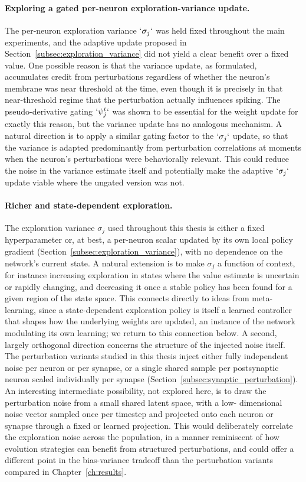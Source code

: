 \paragraph{Exploring a gated per-neuron exploration-variance update.} The
per-neuron exploration variance $`\sigma_j`$ was held fixed throughout the
main experiments, and the adaptive update proposed in
Section~\ref{subsec:exploration_variance} did not yield a clear benefit over
a fixed value. One possible reason is that the variance update, as
formulated, accumulates credit from perturbations regardless of whether the
neuron's membrane was near threshold at the time, even though it is
precisely in that near-threshold regime that the perturbation actually
influences spiking. The pseudo-derivative gating $`\psi_j^t`$ was shown to
be essential for the weight update for exactly this reason, but the
variance update has no analogous mechanism. A natural direction is to
apply a similar gating factor to the $`\sigma_j`$ update, so that the
variance is adapted predominantly from perturbation correlations at
moments when the neuron's perturbations were behaviorally relevant. This
could reduce the noise in the variance estimate itself and potentially make
the adaptive $`\sigma_j`$ update viable where the ungated version was not.

\paragraph{Richer and state-dependent exploration.} The exploration variance
$\sigma_j$ used throughout this thesis is either a fixed hyperparameter
or, at best, a per-neuron scalar updated by its own local policy gradient
(Section~\ref{subsec:exploration_variance}), with no dependence on the
network's current state. A natural extension is to make $\sigma_j$ a
function of context, for instance increasing exploration in states where
the value estimate is uncertain or rapidly changing, and decreasing it
once a stable policy has been found for a given region of the state
space. This connects directly to ideas from meta-learning, since a
state-dependent exploration policy is itself a learned controller that
shapes how the underlying weights are updated, an instance of the network
modulating its own learning; we return to
this connection below. A second, largely orthogonal direction concerns
the structure of the injected noise itself. The perturbation variants
studied in this thesis inject either fully independent noise per neuron
or per synapse, or a single shared sample per postsynaptic neuron scaled
individually per synapse (Section~\ref{subsec:synaptic_perturbation}).
An interesting intermediate possibility, not explored here, is to draw
the perturbation noise from a small shared latent space, with a low-
dimensional noise vector sampled once per timestep and projected onto
each neuron or synapse through a fixed or learned projection. This would
deliberately correlate the exploration noise across the population,
in a manner reminiscent of how evolution strategies can benefit from
structured perturbations, and could offer
a different point in the bias-variance tradeoff than the perturbation
variants compared in Chapter~\ref{ch:results}.

